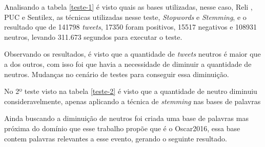 Analisando a tabela \ref{teste-1} é visto quais as bases utilizadas, nesse caso, Reli , PUC e Sentilex, as técnicas utilizadas nesse teste, \textit{Stopwords} e \textit{Stemming}, e o resultado que de 141798 \textit{tweets}, 17350 foram positivos, 15517 negativos e 108931 neutros, levando 311.673 segundos para executar o teste.

Observando os resultados, é visto que a quantidade de \textit{tweets} neutros é maior que a dos outros, com isso foi que havia a necessidade de diminuir a quantidade de neutros. Mudanças no cenário de testes para conseguir essa diminuição. 

\begin{table}[]
	\caption{2º teste}
	\label{teste-2}
\end{table}

No 2º teste visto na tabela \ref{teste-2} é visto que a quantidade de neutro diminuiu consideravelmente, apenas aplicando a técnica de \textit{stemming} nas bases de palavras


Ainda buscando a diminuição de neutros foi criada uma base de palavras mas próxima do domínio que esse trabalho propõe que é o Oscar2016, essa base contem palavras relevantes a esse evento, gerando o seguinte resultado.

